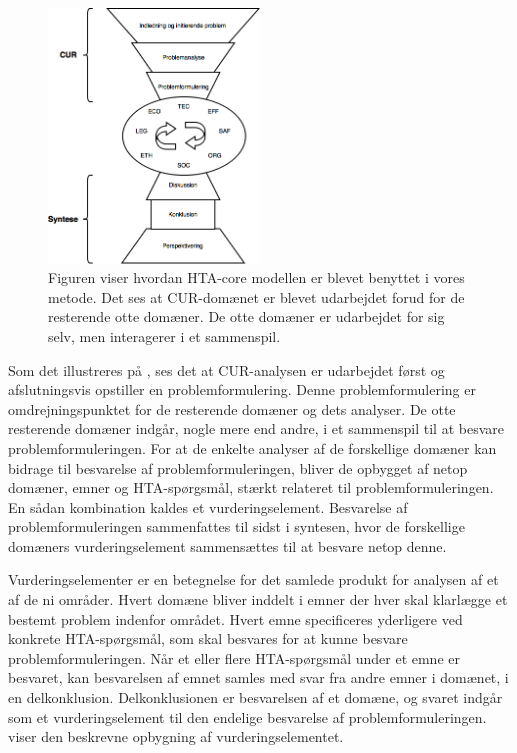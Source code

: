 \begin{figure}[H] 
	\begin{center}
		\includegraphics[width=0.5\textwidth]{figures/cMetode/metode}
	\end{center}
	\caption{Figuren viser hvordan HTA-core modellen er blevet benyttet i vores metode. Det ses at CUR-domænet er blevet udarbejdet forud for de resterende otte domæner. De otte domæner er udarbejdet for sig selv, men interagerer i et sammenspil.} 
	\label{fig:metode} 
\end{figure}

Som det illustreres på , ses det at CUR-analysen er udarbejdet først og afslutningsvis opstiller en problemformulering. Denne problemformulering er omdrejningspunktet for de resterende domæner og dets analyser. De otte resterende domæner indgår, nogle mere end andre, i et sammenspil til at besvare problemformuleringen. For at de enkelte analyser af de forskellige domæner kan bidrage til besvarelse af problemformuleringen, bliver de opbygget af netop domæner, emner og HTA-spørgsmål, stærkt relateret til problemformuleringen. En sådan kombination kaldes et vurderingselement. Besvarelse af problemformuleringen sammenfattes til sidst i syntesen, hvor de forskellige domæners vurderingselement sammensættes til at besvare netop denne.

Vurderingselementer er en betegnelse for det samlede produkt for analysen af et af de ni områder. Hvert domæne bliver inddelt i emner der hver skal klarlægge et bestemt problem indenfor området. Hvert emne specificeres yderligere ved konkrete HTA-spørgsmål, som skal besvares for at kunne besvare problemformuleringen. Når et eller flere HTA-spørgsmål under et emne er besvaret, kan besvarelsen af emnet samles med svar fra andre emner i domænet, i en delkonklusion. Delkonklusionen er besvarelsen af et domæne, og svaret indgår som et vurderingselement til den endelige besvarelse af problemformuleringen. \citep{HTAcore}  viser den beskrevne opbygning af vurderingselementet. 

